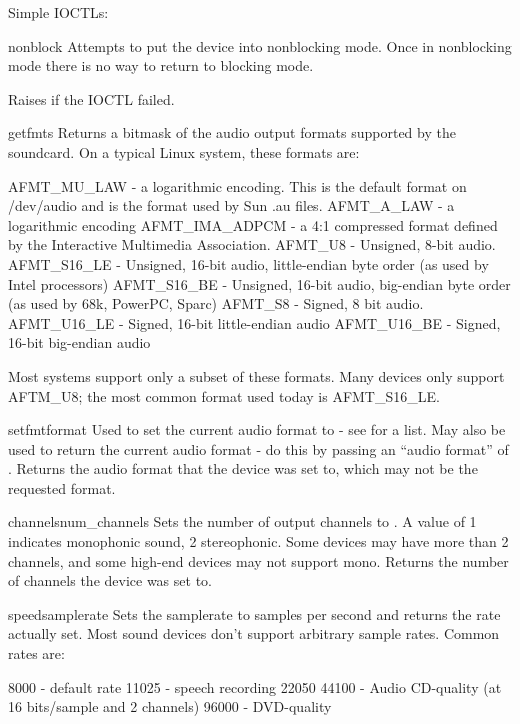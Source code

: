 Simple IOCTLs:

\begin{methoddesc}{nonblock}{}
Attempts to put the device into nonblocking mode. Once in nonblocking mode there
is no way to return to blocking mode.

Raises  if the IOCTL failed.
\end{methoddesc}

\begin{methoddesc}{getfmts}{}
Returns a bitmask of the audio output formats supported by the soundcard.
On a typical Linux system, these formats are:

AFMT_MU_LAW - a logarithmic encoding. This is the default format on /dev/audio
and is the format used by Sun .au files.
AFMT_A_LAW - a logarithmic encoding
AFMT_IMA_ADPCM - a 4:1 compressed format defined by the Interactive Multimedia
Association.
AFMT_U8 - Unsigned, 8-bit audio.
AFMT_S16_LE - Unsigned, 16-bit audio, little-endian byte order (as used by Intel
processors)
AFMT_S16_BE - Unsigned, 16-bit audio, big-endian byte order (as used by 68k,
PowerPC, Sparc)
AFMT_S8 - Signed, 8 bit audio.
AFMT_U16_LE - Signed, 16-bit little-endian audio
AFMT_U16_BE - Signed, 16-bit big-endian audio

Most systems support only a subset of these formats. Many devices only support
AFTM_U8; the most common format used today is AFMT_S16_LE.
\end{methoddesc}

\begin{methoddesc}{setfmt}{format}
Used to set the current audio format to  - see  for a
list. May also be used to return the current audio format - do this by passing
an ``audio format'' of . Returns the audio format that the
device was set to, which may not be the requested format.
\end{methoddesc}

\begin{methoddesc}{channels}{num_channels}
Sets the number of output channels to . A value of 1 indicates
monophonic sound, 2 stereophonic. Some devices may have more than 2 channels,
and some high-end devices may not support mono. Returns the number of channels
the device was set to.
\end{methoddesc}

\begin{methoddesc}{speed}{samplerate}
Sets the samplerate to  samples per second and returns the rate
actually set. Most sound devices don't support arbitrary sample rates. Common
rates are:

8000 - default rate
11025 - speech recording
22050
44100 - Audio CD-quality (at 16 bits/sample and 2 channels)
96000 - DVD-quality
\end{methoddesc}

